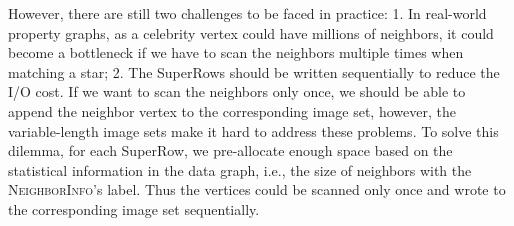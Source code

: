 However, there are still two challenges to be faced in practice:
1. In real-world property graphs, as a celebrity vertex could have millions of neighbors, it could become a bottleneck if we have to scan the neighbors multiple times when matching a star;
2. The SuperRows should be written sequentially to reduce the I/O cost.
If we want to scan the neighbors only once, we should be able to append the neighbor vertex to the corresponding image set, however, the variable-length image sets make it hard to address these problems.
To solve this dilemma, for each SuperRow, we pre-allocate enough space based on the statistical information in the data graph, i.e., the size of neighbors with the \textsc{NeighborInfo}'s label.
Thus the vertices could be scanned only once and wrote to the corresponding image set sequentially.
